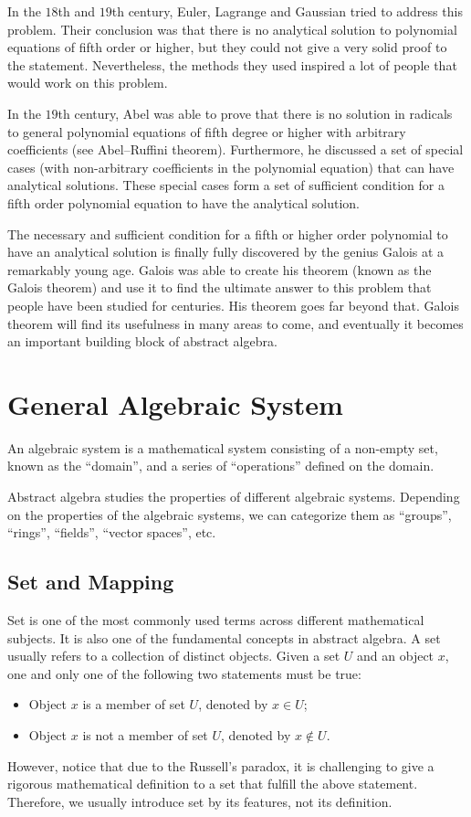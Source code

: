 In the $18$th and $19$th century, Euler, Lagrange and Gaussian tried to address this problem. Their conclusion was that there is no analytical solution to polynomial equations of fifth order or higher, but they could not give a very solid proof to the statement. Nevertheless, the methods they used inspired a lot of people that would work on this problem.

In the $19$th century, Abel was able to prove that there is no solution in radicals to general polynomial equations of fifth degree or higher with arbitrary coefficients (see Abel–Ruffini theorem). Furthermore, he discussed a set of special cases (with non-arbitrary coefficients in the polynomial equation) that can have analytical solutions. These special cases form a set of sufficient condition for a fifth order polynomial equation to have the analytical solution. 

The necessary and sufficient condition for a fifth or higher order polynomial to have an analytical solution is finally fully discovered by the genius Galois at a remarkably young age. Galois was able to create his theorem (known as the Galois theorem) and use it to find the ultimate answer to this problem that people have been studied for centuries. His theorem goes far beyond that. Galois theorem will find its usefulness in many areas to come, and eventually it becomes an important building block of abstract algebra. 

\section{General Algebraic System}

An algebraic system is a mathematical system consisting of a non-empty set, known as the ``domain'', and a series of ``operations'' defined on the domain. 

Abstract algebra studies the properties of different algebraic systems. Depending on the properties of the algebraic systems, we can categorize them as ``groups'', ``rings'', ``fields'', ``vector spaces'', etc.

\subsection{Set and Mapping}

Set is one of the most commonly used terms across different mathematical subjects. It is also one of the fundamental concepts in abstract algebra. A set usually refers to a collection of distinct objects. Given a set $U$ and an object $x$, one and only one of the following two statements must be true:
\begin{itemize}
  \item Object $x$ is a member of set $U$, denoted by $x \in U$;
  \item Object $x$ is not a member of set $U$, denoted by $x \notin U$.
\end{itemize}
However, notice that due to the Russell's paradox, it is challenging to give a rigorous mathematical definition to a set that fulfill the above statement. Therefore, we usually introduce set by its features, not its definition.


